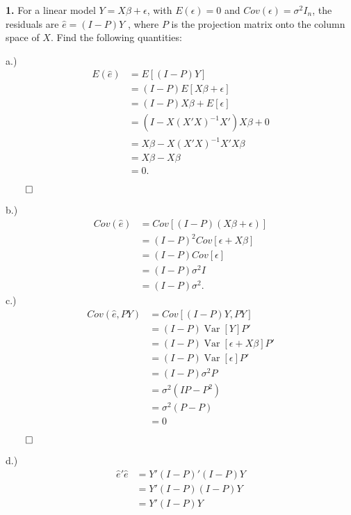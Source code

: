 \documentclass{article}
\newcommand{\Var}{\operatorname{Var}} %
\begin{document}
\setlength{\parindent}{0cm}   %



\textbf{1.} For a linear model \(Y=X\beta + \epsilon \), with \(E(\epsilon) = 0\) and \(Cov(\epsilon)=\sigma^2I_n\), the residuals are \(\hat e = (I-P)Y\) , where \(P\) is the projection matrix onto the column space of \(X\). Find the following quantities:

\vspace{2mm} 
a.)  
\begin{align*}
E(\hat e)&= E[(I-P)Y] \\
&= (I-P)E[X\beta + \epsilon] \\
&= (I-P)X\beta + E[\epsilon] \\
&= (I - X(X'X)^{-1}X') X\beta + 0\\
&=X\beta - X(X'X)^{-1}X' X\beta \\
&= X\beta - X\beta\\
&= 0.
\end{align*} 
 \begin{flushright}
\(\qed\)
\end{flushright} 

b.) 
\begin{align*}
Cov(\hat e) &= Cov[ (I-P)( X\beta + \epsilon ) ] \\ 
&= (I-P)^2 Cov[ \epsilon + X\beta ] \\
&= (I-P) Cov[\epsilon ] \\
&= (I-P)\sigma^2 I \\
&= (I-P)\sigma^2.
\end{align*} 
c.)
\begin{align*}
Cov(\hat e,PY) &= Cov[ (I-P)Y, PY ]  \\  
&= (I-P) \Var[Y] P' \\
&= (I-P) \Var[\epsilon + X\beta] P' \\
&= (I-P) \Var[\epsilon ] P'\\
&= (I-P)\sigma^2 P\\
&= \sigma^2 (IP-P^2)\\
&= \sigma^2(P-P)\\
&= 0 
\end{align*} 
 \begin{flushright}
\(\qed\)
\end{flushright} 

d.) 
\begin{align*}
\hat e' \hat e &= Y'(I-P)'(I-P)Y \\  
&=Y' (I-P)(I-P) Y\\
&= Y'(I-P) Y 
\end{align*} 
\end{document}
